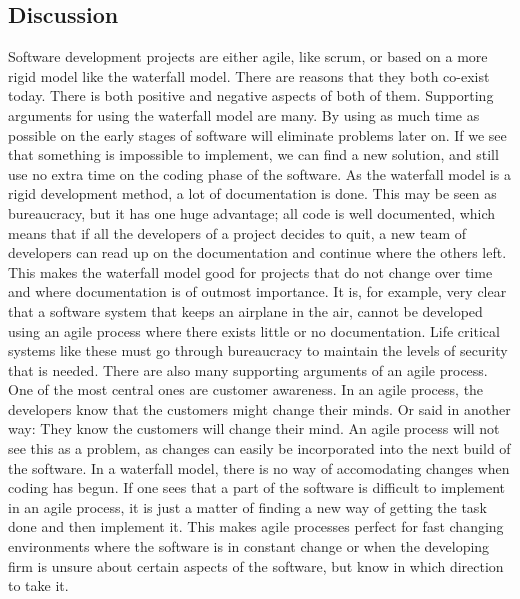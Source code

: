 \subsection{Discussion}
Software development projects are either agile, like scrum,  or based on a more rigid model like the waterfall model. There are reasons that they both co-exist today. There is both positive and negative aspects of both of them. 
\newline
\newline
Supporting arguments for using the waterfall model are many. By using as much time as possible on the early stages of software will eliminate problems later on. If we see that something is impossible to implement, we can find a new solution, and still use no extra time on the coding phase of the software. 
\newline
\newline
As the waterfall model is a rigid development method, a lot of documentation is done. This may be seen as bureaucracy, but it has one huge advantage; all code is well documented, which means that if all the developers of a project decides to quit, a new team of developers can read up on the documentation and continue where the others left. This makes the waterfall model good for projects that do not change over time and where documentation is of outmost importance. It is, for example, very clear that a software system that keeps an airplane in the air, cannot be developed using an agile process where there exists little or no documentation. Life critical systems like these must go through bureaucracy to maintain the levels of security that is needed. 
\newline
\newline
There are also many supporting arguments of an agile process. One of the most central ones are customer awareness. In an agile process, the developers know that the customers might change their minds. Or said in another way: They know the customers will change their mind. An agile process will not see this as a problem, as changes can easily be incorporated into the next build of the software. In a waterfall model, there is no way of accomodating changes when coding has begun. If one sees that a part of the software is difficult to implement in an agile process, it is just a matter of finding a new way of getting the task done and then implement it.  This makes agile processes perfect for fast changing environments where the software is in constant change or when the developing firm is unsure about certain aspects of the software, but know in which direction to take it.  

